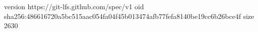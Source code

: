 version https://git-lfs.github.com/spec/v1
oid sha256:486616720a5bc515aac054fa04f45b013474afb77fefa8140be19cc6b26bce4f
size 2630
